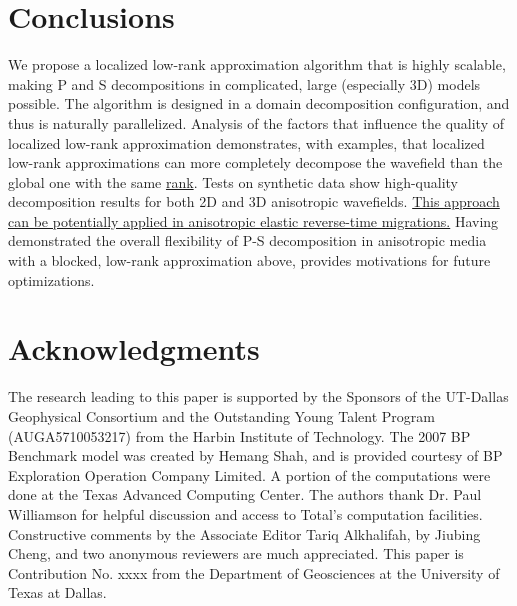\documentclass[manuscript,ulem,graphix,revised]{geophysics}
\begin{document}
\section{Conclusions}
\indent\indent
We propose a localized low-rank approximation algorithm that is highly scalable, making P and S decompositions in complicated, large (especially 3D) models possible.
The algorithm is designed in a domain decomposition configuration, and thus is naturally parallelized. Analysis of the factors that influence the quality of localized low-rank approximation demonstrates, with examples, that localized low-rank approximations can more completely decompose the wavefield than the global one with the same \uline{rank}\marginnote{[1]}. 
Tests on synthetic data show high-quality decomposition results for both 2D and 3D anisotropic wavefields.
\marginnote{[18]}\uline{This approach can be potentially applied in anisotropic elastic reverse-time migrations.} Having demonstrated the overall flexibility of P-S decomposition in anisotropic media with a blocked, low-rank approximation above, provides motivations for future optimizations.


\section{Acknowledgments}
\indent\indent
The research leading to this paper is supported by the Sponsors of the
UT-Dallas Geophysical Consortium and the Outstanding Young Talent Program (AUGA5710053217) from the Harbin Institute of Technology. The 2007 BP Benchmark model was created by Hemang Shah, and is provided courtesy of BP Exploration Operation Company Limited. A portion of the computations were done at the Texas Advanced Computing Center. The authors thank Dr. Paul Williamson for helpful discussion and access to Total's computation facilities. Constructive comments by the Associate Editor Tariq Alkhalifah, by Jiubing Cheng, and two anonymous reviewers are much appreciated. This paper is Contribution No. xxxx from the Department of Geosciences at the University of Texas at Dallas. 




%


%

\newpage


\end{document}
